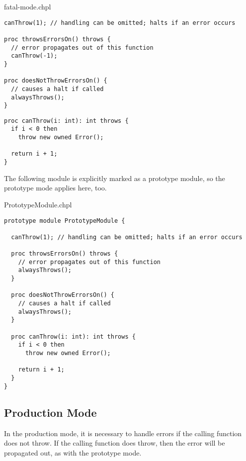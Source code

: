 \begin{chapelexample}{fatal-mode.chpl}
\begin{chapel}
\begin{verbatim}
canThrow(1); // handling can be omitted; halts if an error occurs

proc throwsErrorsOn() throws {
  // error propagates out of this function
  canThrow(-1);
}

proc doesNotThrowErrorsOn() {
  // causes a halt if called
  alwaysThrows();
}
\end{verbatim}
\end{chapel}
\begin{chapelpost}
\begin{verbatim}
proc canThrow(i: int): int throws {
  if i < 0 then
    throw new owned Error();

  return i + 1;
}
\end{verbatim}
\end{chapelpost}
\end{chapelexample}

The following module is explicitly marked as a prototype module,
so the prototype mode applies here, too.

\begin{chapelexample}{PrototypeModule.chpl}
\begin{chapel}
\begin{verbatim}
prototype module PrototypeModule {

  canThrow(1); // handling can be omitted; halts if an error occurs

  proc throwsErrorsOn() throws {
    // error propagates out of this function
    alwaysThrows();
  }

  proc doesNotThrowErrorsOn() {
    // causes a halt if called
    alwaysThrows();
  }

  proc canThrow(i: int): int throws {
    if i < 0 then
      throw new owned Error();

    return i + 1;
  }
}
\end{verbatim}
\end{chapel}
\end{chapelexample}

\subsection{Production Mode}
\label{Production_Mode_for_Explicit_Modules}

In the production mode, it is necessary to handle errors if the
calling function does not throw. If the calling function does
throw, then the error will be propagated out, as with the prototype mode.

